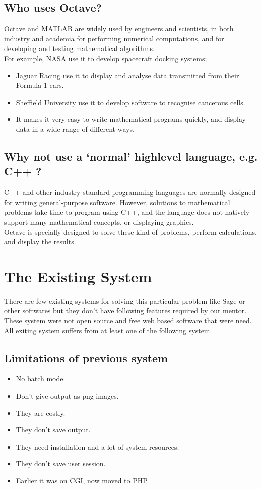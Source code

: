 \subsection{ Who uses Octave?}
Octave and MATLAB are widely used by engineers and scientists, in both industry and
academia for performing numerical computations, and for developing and testing mathematical algorithms.\\
 For example, NASA use it to develop spacecraft docking systems;
\begin{itemize}
\item Jaguar Racing use it to display and analyse data transmitted from their Formula 1 cars.
\item Sheffield University use it to develop software to recognise cancerous cells. 
\item It makes it very easy to write mathematical programs quickly, and display data in a wide range of
different ways.
\end{itemize}
\subsection{Why not use a ‘normal’ highlevel language, e.g. C++ ?}
C++ and other industry-standard programming languages are normally designed for writing general-purpose software. However, solutions to mathematical problems take time to
program using C++, and the language does not natively support many mathematical concepts, or displaying graphics.\\
Octave is specially designed to solve these kind of problems,
perform calculations, and display the results. 

\section{The Existing System}
There are few existing systems for solving this particular problem like Sage or other softwares but
they don’t have following features required by our mentor. These system were not open source
and free web based software that were need.
All exiting system suffers from at least one of the following system.
 \subsection{Limitations of previous system }
\begin{itemize}
\item No batch mode. 

\item Don't give output as png images.

\item They are costly.

\item They don't save output.

\item They need installation and a lot of system resources. 

\item They don't save user session.

\item Earlier it was on CGI, now moved to PHP. 
\end{itemize}
